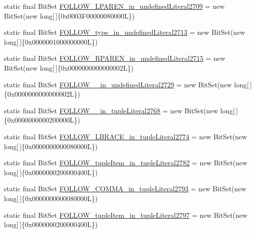 \begin{DoxyCompactItemize}
\item 
static final Bit\-Set \hyperlink{classorg_1_1tzi_1_1use_1_1parser_1_1ocl_1_1_o_c_l_parser_a58a53f55fff963a5563313e6f977ce35}{F\-O\-L\-L\-O\-W\-\_\-\-L\-P\-A\-R\-E\-N\-\_\-in\-\_\-undefined\-Literal2709} = new Bit\-Set(new long\mbox{[}$\,$\mbox{]}\{0x0003\-F00000080000\-L\})
\item 
static final Bit\-Set \hyperlink{classorg_1_1tzi_1_1use_1_1parser_1_1ocl_1_1_o_c_l_parser_aa5fe828e5da042710ac17917e5ff0681}{F\-O\-L\-L\-O\-W\-\_\-type\-\_\-in\-\_\-undefined\-Literal2713} = new Bit\-Set(new long\mbox{[}$\,$\mbox{]}\{0x0000001000000000\-L\})
\item 
static final Bit\-Set \hyperlink{classorg_1_1tzi_1_1use_1_1parser_1_1ocl_1_1_o_c_l_parser_a83183339125c0f7255aac55cb53c64e3}{F\-O\-L\-L\-O\-W\-\_\-\-R\-P\-A\-R\-E\-N\-\_\-in\-\_\-undefined\-Literal2715} = new Bit\-Set(new long\mbox{[}$\,$\mbox{]}\{0x0000000000000002\-L\})
\item 
static final Bit\-Set \hyperlink{classorg_1_1tzi_1_1use_1_1parser_1_1ocl_1_1_o_c_l_parser_a0389e7e8fe76d924b6b482cc7d8d36bb}{F\-O\-L\-L\-O\-W\-\_\-\_\-in\-\_\-undefined\-Literal2729} = new Bit\-Set(new long\mbox{[}$\,$\mbox{]}\{0x0000000000000002\-L\})
\item 
static final Bit\-Set \hyperlink{classorg_1_1tzi_1_1use_1_1parser_1_1ocl_1_1_o_c_l_parser_a9d095518b8ffb61a07505dce6dfa249b}{F\-O\-L\-L\-O\-W\-\_\-\_\-in\-\_\-tuple\-Literal2768} = new Bit\-Set(new long\mbox{[}$\,$\mbox{]}\{0x0000000000200000\-L\})
\item 
static final Bit\-Set \hyperlink{classorg_1_1tzi_1_1use_1_1parser_1_1ocl_1_1_o_c_l_parser_a327cb7a6a6dfde13cbce168a635480db}{F\-O\-L\-L\-O\-W\-\_\-\-L\-B\-R\-A\-C\-E\-\_\-in\-\_\-tuple\-Literal2774} = new Bit\-Set(new long\mbox{[}$\,$\mbox{]}\{0x0000000000080000\-L\})
\item 
static final Bit\-Set \hyperlink{classorg_1_1tzi_1_1use_1_1parser_1_1ocl_1_1_o_c_l_parser_a4090f0ba44955b37b5250074d6305540}{F\-O\-L\-L\-O\-W\-\_\-tuple\-Item\-\_\-in\-\_\-tuple\-Literal2782} = new Bit\-Set(new long\mbox{[}$\,$\mbox{]}\{0x0000000200000400\-L\})
\item 
static final Bit\-Set \hyperlink{classorg_1_1tzi_1_1use_1_1parser_1_1ocl_1_1_o_c_l_parser_a960ac27bb211e95d7918fc9505396478}{F\-O\-L\-L\-O\-W\-\_\-\-C\-O\-M\-M\-A\-\_\-in\-\_\-tuple\-Literal2793} = new Bit\-Set(new long\mbox{[}$\,$\mbox{]}\{0x0000000000080000\-L\})
\item 
static final Bit\-Set \hyperlink{classorg_1_1tzi_1_1use_1_1parser_1_1ocl_1_1_o_c_l_parser_ae0451e2235e338eb448b22ad1391a8e3}{F\-O\-L\-L\-O\-W\-\_\-tuple\-Item\-\_\-in\-\_\-tuple\-Literal2797} = new Bit\-Set(new long\mbox{[}$\,$\mbox{]}\{0x0000000200000400\-L\})

\end{DoxyCompactItemize}
